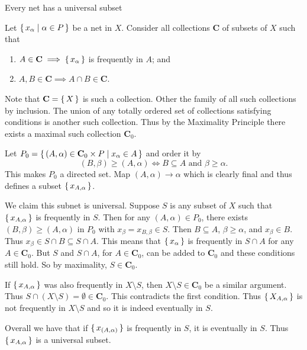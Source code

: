 \documentclass[letterpaper, 11pt, oneside]{book}
\begin{document}
\begin{thrm}\label{thrm: net_has_universal_subnet}
  Every net has a universal subset
\end{thrm}
\begin{pf}
  Let $\set{x_{\alpha} | \alpha \in P}$ be a net in $X$.
  Consider all collections \textbf{C} of subsets of $X$ such that
  \begin{enumerate}
  \item $A \in \textbf{C} \implies \set{x_{\alpha}}$ is frequently in $A$; and
  \item $A, B \in \textbf{C} \implies A \cap B \in \textbf{C}$.
  \end{enumerate}
  Note that $\textbf{C} = \set{X}$ is such a collection.
  Other the family of all such collections by inclusion.
  The union of any totally ordered set of collections satisfying conditions is another such collection.
  Thus by the Maximality Principle there exists a maximal such collection $\textbf{C}_{0}$.

  Let $P_{0} = \set{(A, \alpha) \in \textbf{C}_{0} \times P | x_{\alpha} \in A}$ and order it by
  \[
    (B, \beta) \geq (A, \alpha) \iff B \subseteq A \text{ and } \beta \geq \alpha.
  \]
  This makes $P_{0}$ a directed set.
  Map $(A, \alpha) \to \alpha$ which is clearly final and thus defines a subset $\set{x_{A, \alpha}}$.

  We claim this subnet is universal.
  Suppose $S$ is any subset of $X$ such that $\set{x_{A, \alpha}}$ is frequently in $S$.
  Then for any $(A, \alpha) \in P_{0}$, there exists $(B, \beta) \geq (A, \alpha)$ in $P_{0}$ with $x_{\beta} = x_{B, \beta} \in S$.
  Then $B \subseteq A$, $\beta \geq \alpha$, and $x_{\beta} \in B$.
  Thus $x_{\beta} \in S \cap B \subseteq S \cap A$.
  This means that $\set{x_\alpha}$ is frequently in $S \cap A$ for any $A \in \textbf{C}_{0}$.
  But $S$ and $S \cap A$, for $A \in \textbf{C}_{0}$, can be added to $\textbf{C}_{0}$ and these conditions still hold.
  So by maximality, $S \in \textbf{C}_{0}$.

  If $\set{x_{A, \alpha}}$ was also frequently in $X \setminus S$, then $X \setminus S \in \textbf{C}_{0}$ be a similar argument.
  Thus $S \cap (X \setminus S) = \emptyset \in \textbf{C}_{0}$.
  This contradicts the first condition.
  Thus $\set{X_{A, \alpha}}$ is not frequently in $X \setminus S$ and so it is indeed eventually in $S$.

  Overall we have that if $\set{x_{(A, \alpha)}}$ is frequently in $S$, it is eventually in $S$.
  Thus $\set{x_{A, \alpha}}$ is a universal subset.
\end{pf}
\end{document}
